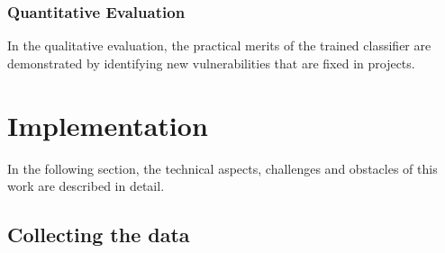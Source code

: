 \documentclass[
	a4paper,
	pagesize,
	pdftex,
	12pt,
	twoside, %
	BCOR=5mm, %
	ngerman,
	fleqn,
	final,
	]{scrartcl}
\begin{document}
\subsubsection{Quantitative Evaluation}
In the qualitative evaluation, the practical merits of the trained classifier are demonstrated by identifying new vulnerabilities that are fixed in projects. 









\newpage
\section{Implementation}
In the following section, the technical aspects, challenges and obstacles of this work are described in detail.

\subsection{Collecting the data}
\end{document}
